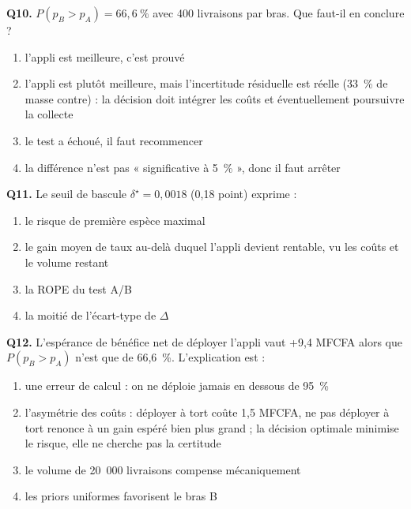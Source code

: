 \documentclass[11pt,a4paper]{article}
\begin{document}
\begin{qcmbox}[Questions 10 à 13]
\textbf{Q10.} $P(p_B > p_A) = 66{,}6~\%$ avec 400 livraisons par bras. Que
faut-il en conclure ?
\begin{enumerate}[label=\Alph*.), leftmargin=8mm, itemsep=0.3mm]
  \item l'appli est meilleure, c'est prouvé
  \item l'appli est plutôt meilleure, mais l'incertitude résiduelle est
        réelle (33~\% de masse contre) : la décision doit intégrer les coûts
        et éventuellement poursuivre la collecte
  \item le test a échoué, il faut recommencer
  \item la différence n'est pas « significative à 5~\% », donc il faut arrêter
\end{enumerate}

\vspace{2mm}
\textbf{Q11.} Le seuil de bascule $\delta^{\star} = 0{,}0018$ (0,18 point)
exprime :
\begin{enumerate}[label=\Alph*.), leftmargin=8mm, itemsep=0.3mm]
  \item le risque de première espèce maximal
  \item le gain moyen de taux au-delà duquel l'appli devient rentable, vu
        les coûts et le volume restant
  \item la ROPE du test A/B
  \item la moitié de l'écart-type de $\Delta$
\end{enumerate}

\vspace{2mm}
\textbf{Q12.} L'espérance de bénéfice net de déployer l'appli vaut +9,4 MFCFA
alors que $P(p_B > p_A)$ n'est que de 66,6~\%. L'explication est :
\begin{enumerate}[label=\Alph*.), leftmargin=8mm, itemsep=0.3mm]
  \item une erreur de calcul : on ne déploie jamais en dessous de 95~\%
  \item l'asymétrie des coûts : déployer à tort coûte 1,5 MFCFA, ne pas
        déployer à tort renonce à un gain espéré bien plus grand ; la
        décision optimale minimise le risque, elle ne cherche pas la
        certitude
  \item le volume de 20~000 livraisons compense mécaniquement
  \item les priors uniformes favorisent le bras B
\end{enumerate}


\end{qcmbox}
\end{document}
